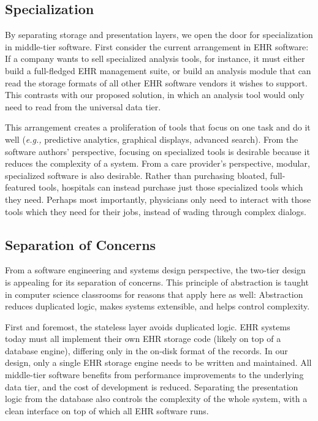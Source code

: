 \subsection{Specialization}
By separating storage and presentation layers, we open the door for specialization in middle-tier software. First consider the current arrangement in EHR software: If a company wants to sell specialized analysis tools, for instance, it must either build a full-fledged EHR management suite, or build an analysis module that can read the storage formats of all other EHR software vendors it wishes to support. This contrasts with our proposed solution, in which an analysis tool would only need to read from the universal data tier.

This arrangement creates a proliferation of tools that focus on one task and do it well (\textit{e.g.,} predictive analytics, graphical displays, advanced search). From the software authors' perspective, focusing on specialized tools is desirable because it reduces the complexity of a system. From a care provider's perspective, modular, specialized software is also desirable. Rather than purchasing bloated, full-featured tools, hospitals can instead purchase just those specialized tools which they need. Perhaps most importantly, physicians only need to interact with those tools which they need for their jobs, instead of wading through complex dialogs.

\subsection{Separation of Concerns}
From a software engineering and systems design perspective, the two-tier design is appealing for its separation of concerns. This principle of abstraction is taught in computer science classrooms for reasons that apply here as well: Abstraction reduces duplicated logic, makes systems extensible, and helps control complexity.

First and foremost, the stateless layer avoids duplicated logic. EHR systems today must all implement their own EHR storage code (likely on top of a database engine), differing only in the on-disk format of the records. In our design, only a single EHR storage engine needs to be written and maintained. All middle-tier software benefits from performance improvements to the underlying data tier, and the cost of development is reduced. Separating the presentation logic from the database also controls the complexity of the whole system, with a clean interface on top of which all EHR software runs.


